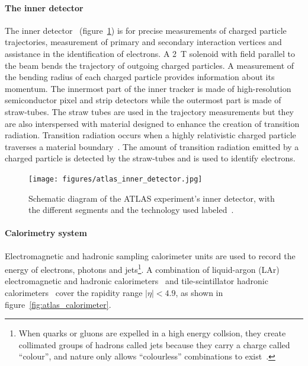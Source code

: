 \paragraph*{The inner detector} \hfill \break
The inner detector~\cite{atlas_inner_detector_tdr_1, atlas_inner_detector_tdr_2} (figure~\ref{fig:atlas_inner_detector}) is for precise measurements of charged particle trajectories, measurement of primary and secondary interaction vertices and assistance in the identification of electrons. A \SI{2}{\tesla} solenoid with field parallel to the beam bends the trajectory of outgoing charged particles. A measurement of the bending radius of each charged particle provides information about its momentum. The innermost part of the inner tracker is made of high-resolution semiconductor pixel and strip detectors while the outermost part is made of straw-tubes. The straw tubes are used in the trajectory measurements but they are also interspersed with material designed to enhance the creation of transition radiation. Transition radiation occurs when a highly relativistic charged particle traverses a material boundary~\cite{grupen_particle_2008}. The amount of transition radiation emitted by a charged particle is detected by the straw-tubes and is used to identify electrons. 

\begin{figure}[h]
    \centering
    \texttt{[image: figures/atlas\_inner\_detector.jpg]}
    \caption{Schematic diagram of the ATLAS experiment's inner detector, with the different segments and the technology used labeled~\cite{collaboration_atlas_2008}.}
    \label{fig:atlas_inner_detector}
\end{figure}

\paragraph*{Calorimetry system} \hfill \break
Electromagnetic and hadronic sampling calorimeter units are used to record the energy of electrons, photons and jets\footnote{When quarks or gluons are expelled in a high energy collsion, they create collimated groups of hadrons called jets because they carry a charge called ``colour'', and nature only allows ``colourless'' combinations to exist~\cite{grupen_particle_2008}.}. A combination of liquid-argon (LAr) electromagnetic and hadronic calorimeters~\cite{atlas_lar_cal_tdr} and tile-scintillator hadronic calorimeters~\cite{atlas_tile_cal_tdr} cover the rapidity range $|\eta| < 4.9$, as shown in figure~\ref{fig:atlas_calorimeter}.

